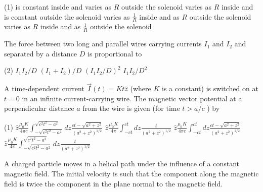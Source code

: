 \begin{enumerate}
\begin{minipage}{\textwidth}
\end{minipage}
\begin{tasks}(1)
	\task[\textbf{A.}]is constant inside and varies as $R$ outside the solenoid
	\task[\textbf{B.}] varies as $R$ inside and is constant outside the solenoid
	\task[\textbf{C.}]varies as $\frac{1}{R}$ inside and as $R$ outside the solenoid
	\task[\textbf{D.}]varies as $R$ inside and as $\frac{1}{R}$ outside the solenoid
\end{tasks}
\begin{minipage}{\textwidth}
	\item The force between two long and parallel wires carrying currents $I_{1}$ and $I_{2}$ and separated by a distance $D$ is proportional to
\end{minipage}
\begin{tasks}(2)
	\task[\textbf{A.}] $I_{1} I_{2} / D$
	\task[\textbf{B.}]$\left(I_{1}+I_{2}\right) / D$
	\task[\textbf{C.}]$\left(I_{1} I_{2} / D\right)^{2}$
	\task[\textbf{D.}]$I_{1} I_{2} / D^{2}$
\end{tasks}
\begin{minipage}{\textwidth}
	\item A time-dependent current $\vec{I}(t)=K t \hat{z}$ (where $K$ is a constant) is switched on at $t=0$ in an infinite current-carrying wire. The magnetic vector potential at a perpendicular distance $a$ from the wire is given (for time $t>a / c$ ) by
\end{minipage}
\begin{tasks}(1)
	\task[\textbf{A.}] $\hat{z} \frac{\mu_{0} K}{4 \pi c} \int_{-\sqrt{c^{2} t^{2}-a^{2}}}^{\sqrt{c^{2} t^{2}-a^{2}}} d z \frac{c t-\sqrt{a^{2}+z^{2}}}{\left(a^{2}+z^{2}\right)^{1 / 2}}$
	\task[\textbf{B.}] $\hat{z} \frac{\mu_{0} K}{4 \pi} \int_{-c t}^{c t} d z \frac{t}{\left(a^{2}+z^{2}\right)^{1 / 2}}$
	\task[\textbf{C.}] $\hat{z} \frac{\mu_{0} K}{4 \pi c} \int_{-c t}^{c t} d z \frac{c t-\sqrt{a^{2}+z^{2}}}{\left(a^{2}+z^{2}\right)^{1 / 2}}$
	\task[\textbf{D.}] $\hat{z} \frac{\mu_{0} K}{4 \pi} \int_{-\sqrt{c^{2} t^{2}-a^{2}}}^{\sqrt{c^{2} t^{2}-a^{2}}} d z \frac{t}{\left(a^{2}+z^{2}\right)^{1 / 2}}$
\end{tasks}
\begin{minipage}{\textwidth}
	\item A charged particle moves in a helical path under the influence of a constant magnetic field. The initial velocity is such that the component along the magnetic field is twice the component in the plane normal to the magnetic field.

\end{minipage}
\end{enumerate}
